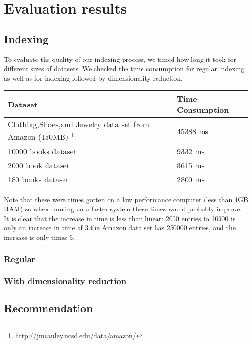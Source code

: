 \documentclass[10pt,a4paper]{paper}
\begin{document}
\section{Evaluation results}

\subsection{Indexing}

To evaluate the quality of our indexing process, we timed how long it took for different sizes of datasets. We checked the time consumption for regular indexing as well as for indexing followed by dimensionality reduction. 

\begin{tabular} {l|l}
Dataset & Time Consumption \\ \hline
Clothing,Shoes,and Jewelry data set from Amazon (150MB) \footnote{\url{http://jmcauley.ucsd.edu/data/amazon/}} &  45388 ms \\ \hline
10000 books dataset & 9332 ms \\ \hline
2000 book dataset & 3615 ms \\ \hline
180 books dataset & 2800 ms \\ \hline

\end{tabular}
Note that these were times gotten on a low performance computer (less than 4GB RAM) so when running on a faster system these times would probably improve.
It is clear that the increase in time is less than linear: 2000 entries to 10000 is only an increase in time of 3.the Amazon data set has 250000 entries, and the increase is only times 5.


\subsubsection{Regular}


\subsubsection{With dimensionality reduction}


\subsection{Recommendation}
\end{document}
